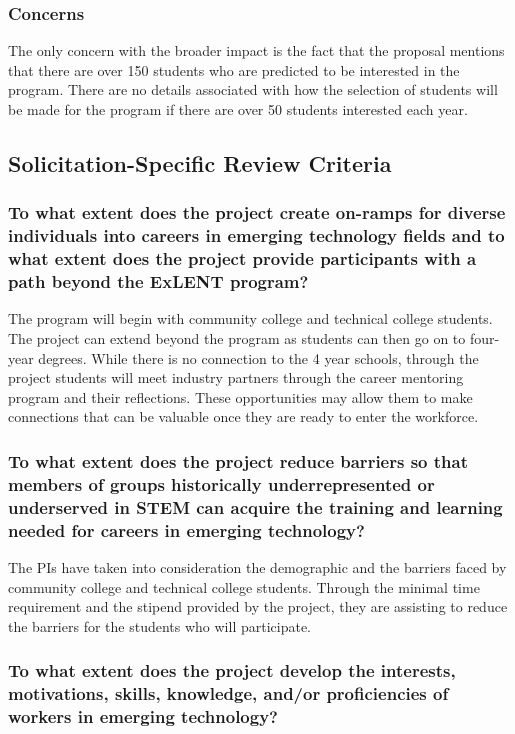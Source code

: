 \subsubsection{Concerns}

The only concern with the broader impact is the fact that the proposal mentions that there are over 150 students who are predicted to be interested in the program. There are no details associated with how the selection of students will be made for the program if there are over 50 students interested each year. 


\subsection{Solicitation-Specific Review Criteria}

\subsubsection{To what extent does the project create on-ramps for diverse individuals into careers in emerging technology fields and to what extent does the project provide participants with a path beyond the ExLENT program?}

The program will begin with community college and technical college students. The project can extend beyond the program as students can then go on to four-year degrees. While there is no connection to the 4 year schools, through the project students will meet industry partners through the career mentoring program and their reflections. These opportunities may allow them to make connections that can be valuable once they are ready to enter the workforce. 

\subsubsection{To what extent does the project reduce barriers so that members of groups historically underrepresented or underserved in STEM can acquire the training and learning needed for careers in emerging technology?}

The PIs have taken into consideration the demographic and the barriers faced by community college and technical college students. Through the minimal time requirement and the stipend provided by the project, they are assisting to reduce the barriers for the students who will participate. 

\subsubsection{To what extent does the project develop the interests, motivations, skills, knowledge, and/or proficiencies of workers in emerging technology?}

